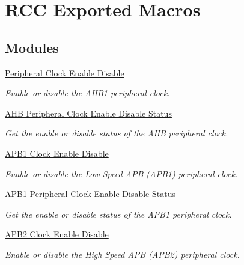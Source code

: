 \hypertarget{group___r_c_c___exported___macros}{}\section{R\+CC Exported Macros}
\label{group___r_c_c___exported___macros}
\subsection*{Modules}
\begin{DoxyCompactItemize}
\item 
\hyperlink{group___r_c_c___peripheral___clock___enable___disable}{Peripheral Clock Enable Disable}
\begin{DoxyCompactList}\small\item\em Enable or disable the A\+H\+B1 peripheral clock. \end{DoxyCompactList}\item 
\hyperlink{group___r_c_c___a_h_b___peripheral___clock___enable___disable___status}{A\+H\+B Peripheral Clock Enable Disable Status}
\begin{DoxyCompactList}\small\item\em Get the enable or disable status of the A\+HB peripheral clock. \end{DoxyCompactList}\item 
\hyperlink{group___r_c_c___a_p_b1___clock___enable___disable}{A\+P\+B1 Clock Enable Disable}
\begin{DoxyCompactList}\small\item\em Enable or disable the Low Speed A\+PB (A\+P\+B1) peripheral clock. \end{DoxyCompactList}\item 
\hyperlink{group___r_c_c___a_p_b1___peripheral___clock___enable___disable___status}{A\+P\+B1 Peripheral Clock Enable Disable Status}
\begin{DoxyCompactList}\small\item\em Get the enable or disable status of the A\+P\+B1 peripheral clock. \end{DoxyCompactList}\item 
\hyperlink{group___r_c_c___a_p_b2___clock___enable___disable}{A\+P\+B2 Clock Enable Disable}
\begin{DoxyCompactList}\small\item\em Enable or disable the High Speed A\+PB (A\+P\+B2) peripheral clock. \end{DoxyCompactList}\item 

\end{DoxyCompactItemize}
